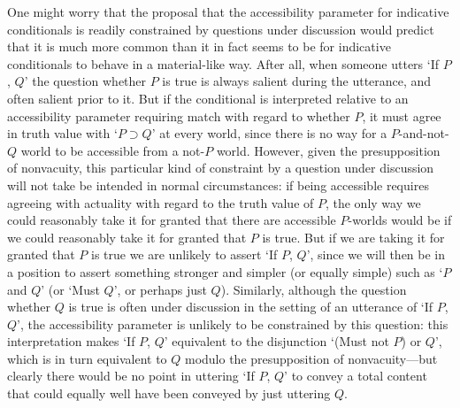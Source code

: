 \documentclass[If.tex]{subfiles}
\begin{document}
One might worry that the proposal that the accessibility parameter for indicative conditionals is readily constrained by questions under discussion would predict that it is much more common than it in fact seems to be for indicative conditionals to behave in a material-like way.  After all, when someone utters ‘If $P$, $Q$’ the question whether $P$ is true is always salient during the utterance, and often salient prior to it.  But if the conditional is interpreted relative to an accessibility parameter requiring match with regard to whether $P$, it must agree in truth value with ‘$P⊃Q$’ at every world, since there is no way for a $P$-and-not-$Q$ world to be accessible from a not-$P$ world.  However, given the presupposition of nonvacuity, this particular kind of constraint by a question under discussion will not take be intended in normal circumstances: if being accessible requires agreeing with actuality with regard to the truth value of $P$, the only way we could reasonably take it for granted that there are accessible $P$-worlds would be if we could reasonably take it for granted that $P$ is true.  But if we are taking it for granted that $P$ is true we are unlikely to assert ‘If $P$, $Q$’, since we will then be in a position to assert something stronger and simpler (or equally simple) such as ‘$P$ and $Q$’ (or ‘Must $Q$’, or perhaps just $Q$).  Similarly, although the question whether $Q$ is true is often under discussion in the setting of an utterance of ‘If $P$, $Q$’, the accessibility parameter is unlikely to be constrained by this question: this interpretation makes ‘If $P$, $Q$’ equivalent to the disjunction ‘(Must not $P$) or $Q$’, which is in turn equivalent to $Q$ modulo the presupposition of nonvacuity---but clearly there would be no point in uttering ‘If $P$, $Q$’ to convey a total content that could equally well have been conveyed by just uttering $Q$.  


\end{document}
